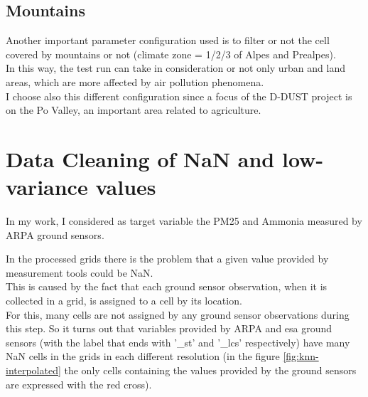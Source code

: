 \subsection{Mountains}
Another important parameter configuration used is to filter or not the cell covered by mountains or not (climate zone = 1/2/3 of Alpes and Prealpes). \\ 
In this way, the test run can take in consideration or not only urban and land areas, which are more affected by air pollution phenomena.\\
I choose also this different configuration since a focus of the D-DUST project is on the Po Valley, an important area related to agriculture.
\section{Data Cleaning of NaN and low-variance values }
\label{subsec:nan}
In my work, I considered as target variable the PM25 and Ammonia measured by ARPA ground sensors.\\

\newline
In the processed grids there is the problem that a given value provided by measurement tools could be NaN. \\
This is caused by the fact that each ground sensor observation, when it is collected in a grid, is assigned to a cell by its location. \\
For this, many cells are not assigned by any ground sensor observations during this step.
So it turns out that variables provided by ARPA and \acrshort{esa} ground sensors (with the label that ends with '\_st' and '\_lcs' respectively) have many NaN cells in the grids in each different resolution (in the figure \ref{fig:knn-interpolated} the only cells containing the values provided by the ground sensors are expressed with the red cross).
